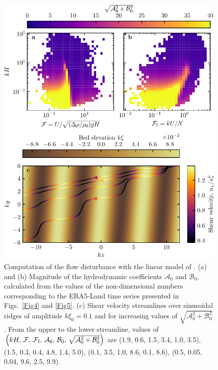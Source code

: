 \begin{figure}[p]
\centering
\includegraphics[scale=1]{Figures/Figure13_supp.pdf}
\caption{Computation of the flow disturbance with the linear model of \citet{andreotti2009}. (a) and (b) Magnitude of the hydrodynamic coefficients $\mathcal{A}_0$ and $\mathcal{B}_0$, calculated from the values of the non-dimensional numbers corresponding to the ERA5-Land time series presented in Figs.~\ref{Fig4} and \ref{Fig5}. (c) Shear velocity streamlines over sinusoidal ridges of amplitude $k\xi_0 = 0.1$ and for increasing values of $\sqrt{\mathcal{A}_{0}^{2} + \mathcal{B}_{0}^{2}}$. From the upper to the lower streamline, values of $\left(kH,\, \mathcal{F},\, \mathcal{F}_{\rm I},\, \mathcal{A}_{0},\, \mathcal{B}_{0},\, \sqrt{\mathcal{A}_{0}^{2} + \mathcal{B}_{0}^{2}}\right)$ are (1.9, 0.6, 1.5, 3.4, 1.0, 3.5), (1.5, 0.3, 0.4, 4.8, 1.4, 5.0), (0.1, 3.5, 1.0, 8.6, 0.1, 8.6), (0.5, 0.05, 0.04, 9.6, 2.5, 9.9).}
\label{Fig13_supp}
\end{figure}


